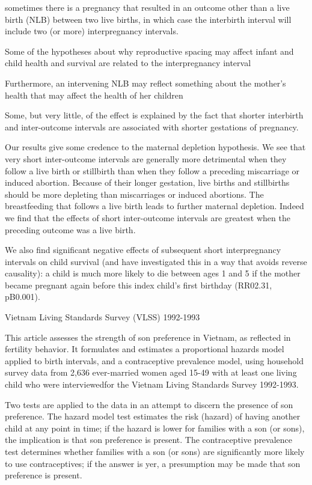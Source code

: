sometimes there is a pregnancy that resulted in an outcome other than a
live birth (NLB) between two live births, in which case the interbirth
interval will include two (or more) interpregnancy intervals.

Some of the hypotheses about why reproductive spacing may affect infant
and child health and survival are related to the interpregnancy interval

Furthermore, an intervening NLB may reflect something about the mother’s
health that may affect the health of her children

Some, but very little, of the effect is explained by the fact that
shorter interbirth and inter-outcome intervals are associated with
shorter gestations of pregnancy.

Our results give some credence to the maternal depletion hypothesis.
We see that very short inter-outcome intervals are generally more
detrimental when they follow a live birth or stillbirth than when they
follow a preceding miscarriage or induced abortion. Because of their
longer gestation, live births and stillbirths should be more depleting
than miscarriages or induced abortions.
The breastfeeding that follows a live birth leads to further maternal
depletion. Indeed we find that the effects of short inter-outcome
intervals are greatest when the preceding outcome was a live birth.

We also find significant negative effects of subsequent short
interpregnancy intervals on child survival (and have investigated this
in a way that avoids reverse causality): a child is much more likely to
die between ages 1 and 5 if the mother became pregnant again before this
index child’s first birthday (RR02.31, pB0.001).

\citep{Haughton1995}

Vietnam Living Standards Survey (VLSS) 1992-1993

This article assesses the strength of son preference in Vietnam, as
reflected in fertility behavior. It
formulates and estimates a proportional hazards model applied to birth
intervals, and a contraceptive
prevalence model, using household survey data from 2,636 ever-married
women aged 15-49 with at
least one living child who were interviewedfor the Vietnam Living
Standards Survey 1992-1993.

 Two tests are applied to the data in an attempt to discern the presence
of son preference. The hazard
model test estimates the risk (hazard) of having another
child at any point in time; if the hazard is lower for families with a
son (or sons),
the implication is that son preference is present. The contraceptive
prevalence test
determines whether families with a son (or sons) are significantly more
likely to use
contraceptives; if the answer is yer, a presumption may be made that son
preference is present.

